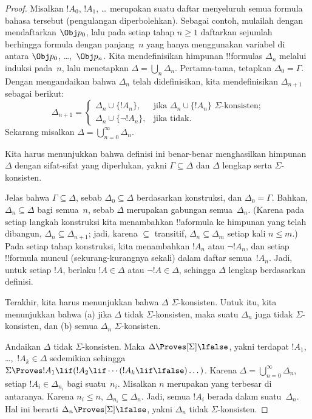 \documentclass[../../../include/open-logic-section]{subfiles}
\begin{document}
\begin{proof}
Misalkan $!A_0$, $!A_1$, \dots{} merupakan suatu daftar menyeluruh semua
formula bahasa tersebut (pengulangan diperbolehkan). Sebagai contoh, mulailah
dengan mendaftarkan $\Obj p_0$, lalu pada setiap tahap $n \ge 1$ daftarkan
sejumlah berhingga formula dengan panjang~$n$ yang hanya menggunakan variabel
di antara $\Obj p_0$, \dots,~$\Obj p_n$. Kita mendefinisikan himpunan
!!{formula}s $\Delta_n$ melalui induksi pada~$n$, lalu menetapkan
$\Delta = \bigcup_n \Delta_n$. Pertama-tama, tetapkan
$\Delta_0 = \Gamma$. Dengan mengandaikan bahwa $\Delta_n$ telah didefinisikan,
kita mendefinisikan $\Delta_{n+1}$ sebagai berikut:
\[
\Delta_{n+1} =
\begin{cases}
  \Delta_n \cup \{!A_n\}, & \text{jika $\Delta_n \cup \{ !A_n\}$
    $\Sigma$-konsisten;} \\
  \Delta_n \cup \{ \lnot !A_n\}, & \text{jika tidak.}
\end{cases}
\]
Sekarang misalkan $\Delta = \bigcup_{n=0}^\infty \Delta_n$.

Kita harus menunjukkan bahwa definisi ini benar-benar menghasilkan himpunan
$\Delta$ dengan sifat-sifat yang diperlukan, yakni $\Gamma \subseteq \Delta$
dan $\Delta$ lengkap serta $\Sigma$-konsisten.

Jelas bahwa $\Gamma \subseteq \Delta$, sebab $\Delta_0 \subseteq \Delta$
berdasarkan konstruksi, dan $\Delta_0 = \Gamma$. Bahkan,
$\Delta_n \subseteq \Delta$ bagi semua~$n$, sebab $\Delta$ merupakan gabungan
semua~$\Delta_n$. (Karena pada setiap langkah konstruksi kita menambahkan
!!a{formula} ke himpunan yang telah dibangun, $\Delta_n \subseteq
\Delta_{n+1}$; jadi, karena $\subseteq$ transitif, $\Delta_n \subseteq
\Delta_{m}$ setiap kali $n \le m$.) Pada setiap tahap konstruksi, kita
menambahkan $!A_n$ atau $\lnot !A_n$, dan setiap !!{formula} muncul
(sekurang-kurangnya sekali) dalam daftar semua~$!A_n$. Jadi, untuk setiap
$!A$, berlaku $!A \in \Delta$ atau $\lnot !A \in \Delta$, sehingga $\Delta$
lengkap berdasarkan definisi.

Terakhir, kita harus menunjukkan bahwa $\Delta$ $\Sigma$-konsisten. Untuk itu,
kita menunjukkan bahwa (a) jika $\Delta$ tidak $\Sigma$-konsisten, maka suatu
$\Delta_n$ juga tidak $\Sigma$-konsisten, dan (b) semua $\Delta_n$
$\Sigma$-konsisten.

Andaikan $\Delta$ tidak $\Sigma$-konsisten. Maka $\Delta
\Proves[\Sigma] \lfalse$, yakni terdapat $!A_1$, \dots,~$!A_k \in
\Delta$ sedemikian sehingga $\Sigma \Proves !A_1 \lif (!A_2 \lif \cdots (!A_k
\lif \lfalse)\dots)$. Karena $\Delta = \bigcup_{n=0}^\infty \Delta_n$, setiap
$!A_i \in \Delta_{n_i}$ bagi suatu~$n_i$. Misalkan $n$ merupakan yang
terbesar di antaranya. Karena $n_i \le n$, $\Delta_{n_i} \subseteq \Delta_n$.
Jadi, semua $!A_i$ berada dalam suatu~$\Delta_n$. Hal ini berarti $\Delta_n
\Proves[\Sigma] \lfalse$, yakni $\Delta_n$ tidak $\Sigma$-konsisten.


\end{proof}
\end{document}
